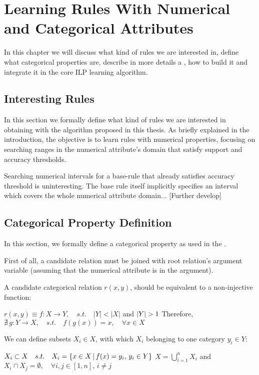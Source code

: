 \chapter{Learning Rules With Numerical and Categorical Attributes}
\label{cl:intro}

In this chapter we will discuss what kind of rules we are interested in, define what categorical properties are, describe in more details a \graphname, how to build it and integrate it in the core ILP learning algorithm.

\section{Interesting Rules}

In this section we formally define what kind of rules we are interested in obtaining with the algorithm proposed in
this thesis. As briefly explained in the introduction, the objective is to learn rules with numerical properties, focusing on searching ranges in the numerical attribute's domain that satisfy support and accuracy thresholds.

Searching numerical intervals for a base-rule that already satisfies accuracy threshold is uninteresting. The base rule itself implicitly specifies an interval which covers the whole numerical attribute domain... [Further develop] 
 
\section{Categorical Property Definition}

In this section, we formally define a categorical property as used in the \graphname. 

First of all, a candidate relation must be joined with root relation's  argument variable (assuming that the numerical
attribute is in the  argument). 

A candidate categorical relation $r(x,y)$, should be equivalent to a non-injective function:

$r(x,y) \equiv f : X \rightarrow Y , \quad s.t. \quad |Y|<|X| $ and $ |Y|>1 \newline $
Therefore, $\nexists \, g : Y \rightarrow X , \quad s.t. \quad f(g(x))=x , \quad \forall x \in X$

We can define subsets $X_i \in X$, with which $X_i$ belonging to one category $y_i \in Y$:

$X_i \subset X \quad s.t. \quad X_i = \{x \in X \,|\, f(x)=y_i ,\, y_i \in Y\} \newline $
$X = \bigcup_{i=1}^{n} X_i $ and $ X_i \cap X_j = \emptyset ,\quad \forall i,j \in [1,n] ,\, i \neq j$

